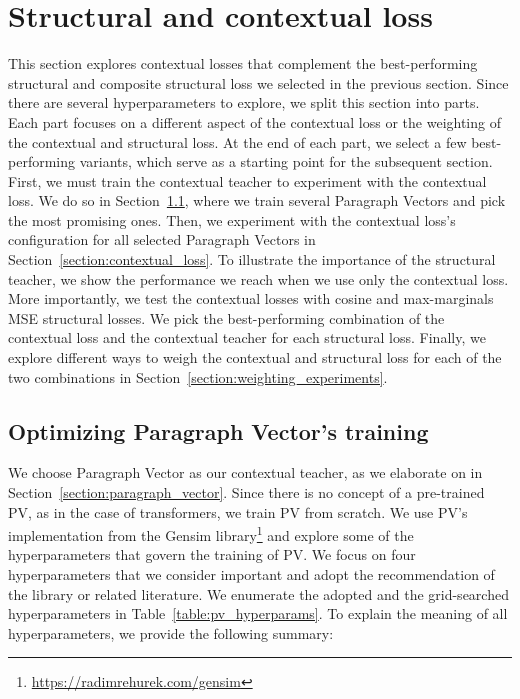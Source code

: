 \section{Structural and contextual loss}\label{section:structural_and_contextual}

This section explores contextual losses that complement the best-performing structural and composite structural loss we selected in the previous
section. Since there are several hyperparameters to explore, we split this
section into parts. Each part focuses on a different aspect of the contextual
loss or the weighting of the contextual and structural loss. At the end of each part, we select a few
best-performing variants, which serve as a starting point for the subsequent section. First, we must train the
contextual teacher to experiment with the contextual loss. We do so in Section~\ref{section:pv_training}, where we
train several Paragraph Vectors and pick the most promising ones. Then, we
experiment with the contextual loss's configuration for all selected Paragraph
Vectors in Section~\ref{section:contextual_loss}. To illustrate the importance of the structural teacher, we show the performance we reach when we use only the contextual loss. More importantly, we test
the contextual losses with cosine and max-marginals MSE structural
losses. We pick the best-performing combination of
the contextual loss and the contextual teacher for each structural loss. Finally, we explore
different ways to weigh the contextual and structural loss for each of the two
combinations in Section~\ref{section:weighting_experiments}.

\subsection{Optimizing Paragraph Vector's training}\label{section:pv_training}

We choose Paragraph Vector \citep{le2014distributed} as our contextual teacher,
as we elaborate on in Section~\ref{section:paragraph_vector}. Since there is no
concept of a pre-trained PV, as in the case of transformers, we train PV from
scratch. We use PV's implementation from the Gensim
library\footnote{\label{fn:link_to_gensim}\url{https://radimrehurek.com/gensim}}
and explore some of the hyperparameters that govern the training of PV. We
focus on four hyperparameters that we consider important and adopt the
recommendation of the library or related literature. We enumerate the adopted and the grid-searched hyperparameters in
Table~\ref{table:pv_hyperparams}. To explain the meaning of all hyperparameters,
we provide the following summary:


